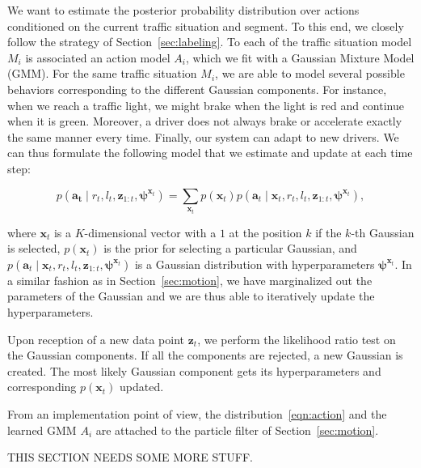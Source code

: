 We want to estimate the posterior probability distribution over actions
conditioned on the current traffic situation and segment. To this end, we
closely follow the strategy of Section~\ref{sec:labeling}. To each of the
traffic situation model $M_i$ is associated an action model $A_i$, which we fit
with a Gaussian Mixture Model (GMM). For the same traffic situation $M_i$, we
are able to model several possible behaviors corresponding to the different
Gaussian components. For instance, when we reach a traffic light, we might brake
when the light is red and continue when it is green. Moreover, a driver does not
always brake or accelerate exactly the same manner every time. Finally, our
system can adapt to new drivers. We can thus formulate the following model that
we estimate and update at each time step:

\begin{equation}
\label{eqn:action}
p(\mathbf{a_t} \mid r_t, l_t,\mathbf{z}_{1:t},\boldsymbol{\psi}^{\mathbf{x}_t})=
\sum_{\mathbf{x}_t} p(\mathbf{x}_t)p(\mathbf{a}_t\mid\mathbf{x}_t,r_t,l_t,
\mathbf{z}_{1:t},\boldsymbol{\psi}^{\mathbf{x}_t}),
\end{equation}

where $\mathbf{x}_t$ is a $K$-dimensional vector with a $1$ at the position $k$
if the $k$-th Gaussian is selected, $p(\mathbf{x}_t)$ is the prior for selecting
a particular Gaussian, and $p(\mathbf{a}_t\mid\mathbf{x}_t,r_t,l_t,
\mathbf{z}_{1:t},\boldsymbol{\psi}^{\mathbf{x}_t})$ is a Gaussian distribution with
hyperparameters $\boldsymbol{\psi}^{\mathbf{x}_t}$. In a similar fashion as in
Section~\ref{sec:motion}, we have marginalized out the parameters of the
Gaussian and we are thus able to iteratively update the hyperparameters.

Upon reception of a new data point $\mathbf{z}_t$, we perform the likelihood
ratio test on the Gaussian components. If all the components are rejected, a new
Gaussian is created. The most likely Gaussian component gets its hyperparameters
and corresponding $p(\mathbf{x}_t)$ updated.

From an implementation point of view, the distribution~\eqref{eqn:action} and
the learned GMM $A_i$ are attached to the particle filter of
Section~\ref{sec:motion}.

THIS SECTION NEEDS SOME MORE STUFF.
